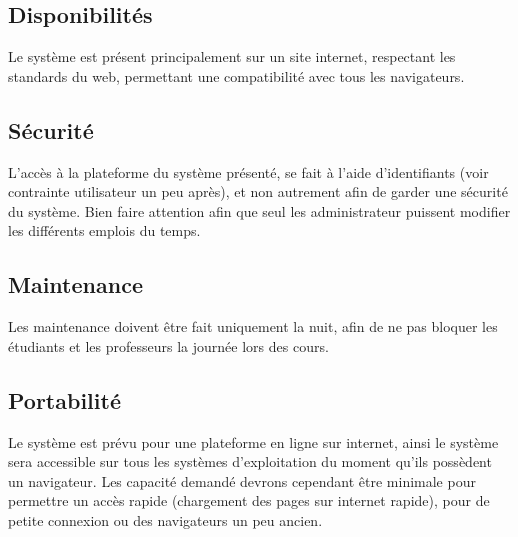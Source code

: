 \documentclass[a4paper, 11pt]{article}
\begin{document}
        \subsection{Disponibilités}
        Le système est présent principalement sur un site internet, respectant les standards du web, permettant une compatibilité avec tous les navigateurs.
        \subsection{ Sécurité}
        L'accès à la plateforme du système présenté, se fait à l'aide d'identifiants (voir contrainte utilisateur un peu après), et non autrement afin de garder une sécurité du système. Bien faire attention afin que seul les administrateur puissent modifier les différents emplois du temps. 
        \subsection{Maintenance}
        Les maintenance doivent être fait uniquement la nuit, afin de ne pas bloquer les étudiants et les professeurs la journée lors des cours.
        \subsection{ Portabilité}
        Le système est prévu pour une plateforme en ligne sur internet, ainsi le système sera accessible sur tous les systèmes d'exploitation du moment qu'ils possèdent un navigateur. Les capacité demandé devrons cependant être minimale pour permettre un accès rapide (chargement des pages sur internet rapide), pour de petite connexion ou des navigateurs un peu ancien.
	\clearpage
\end{document}
